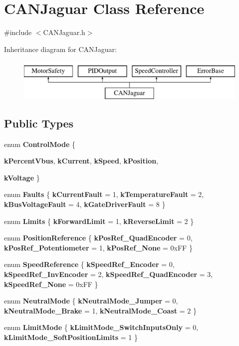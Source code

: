 \hypertarget{classCANJaguar}{
\section{CANJaguar Class Reference}
\label{classCANJaguar}
}


{\ttfamily \#include $<$CANJaguar.h$>$}

Inheritance diagram for CANJaguar:\begin{figure}[H]
\begin{center}
\leavevmode
\includegraphics[height=2.000000cm]{classCANJaguar}
\end{center}
\end{figure}
\subsection*{Public Types}
\begin{DoxyCompactItemize}
\item 
enum {\bfseries ControlMode} \{ \par
{\bfseries kPercentVbus}, 
{\bfseries kCurrent}, 
{\bfseries kSpeed}, 
{\bfseries kPosition}, 
\par
{\bfseries kVoltage}
 \}
\item 
enum {\bfseries Faults} \{ {\bfseries kCurrentFault} =  1, 
{\bfseries kTemperatureFault} =  2, 
{\bfseries kBusVoltageFault} =  4, 
{\bfseries kGateDriverFault} =  8
 \}
\item 
enum {\bfseries Limits} \{ {\bfseries kForwardLimit} =  1, 
{\bfseries kReverseLimit} =  2
 \}
\item 
enum {\bfseries PositionReference} \{ {\bfseries kPosRef\_\-QuadEncoder} =  0, 
{\bfseries kPosRef\_\-Potentiometer} =  1, 
{\bfseries kPosRef\_\-None} =  0xFF
 \}
\item 
enum {\bfseries SpeedReference} \{ {\bfseries kSpeedRef\_\-Encoder} =  0, 
{\bfseries kSpeedRef\_\-InvEncoder} =  2, 
{\bfseries kSpeedRef\_\-QuadEncoder} =  3, 
{\bfseries kSpeedRef\_\-None} =  0xFF
 \}
\item 
enum {\bfseries NeutralMode} \{ {\bfseries kNeutralMode\_\-Jumper} =  0, 
{\bfseries kNeutralMode\_\-Brake} =  1, 
{\bfseries kNeutralMode\_\-Coast} =  2
 \}
\item 
enum {\bfseries LimitMode} \{ {\bfseries kLimitMode\_\-SwitchInputsOnly} =  0, 
{\bfseries kLimitMode\_\-SoftPositionLimits} =  1
 \}
\end{DoxyCompactItemize}
